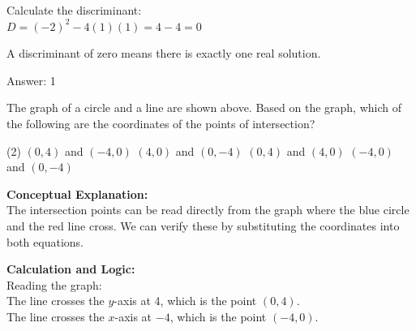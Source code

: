 \documentclass[11pt,paper=a4,answers]{exam}
\begin{document}
\begin{questions}
\begin{solution}
Calculate the discriminant: \\
$D = (-2)^2 - 4(1)(1) = 4 - 4 = 0$

\vspace{10pt}

A discriminant of zero means there is exactly one real solution.

\vspace{25pt}

Answer: \colorbox{yellow!100}{1}
\end{solution}

\vspace{40pt}

\question
\begin{center}
\end{center}
The graph of a circle and a line are shown above. Based on the graph, which of the following are the coordinates of the points of intersection?
\begin{tasks}(2)
    \task $(0, 4)$ and $(-4, 0)$
    \task $(4, 0)$ and $(0, -4)$
    \task $(0, 4)$ and $(4, 0)$
    \task $(-4, 0)$ and $(0, -4)$
\end{tasks}

\begin{solution}
\textbf{Conceptual Explanation:} \\
The intersection points can be read directly from the graph where the blue circle and the red line cross. We can verify these by substituting the coordinates into both equations.

\vspace{20pt}

\textbf{Calculation and Logic:} \\
Reading the graph: \\
The line crosses the $y$-axis at 4, which is the point $(0, 4)$. \\
The line crosses the $x$-axis at $-4$, which is the point $(-4, 0)$.

\vspace{10pt}


\end{solution}
\end{questions}
\end{document}
